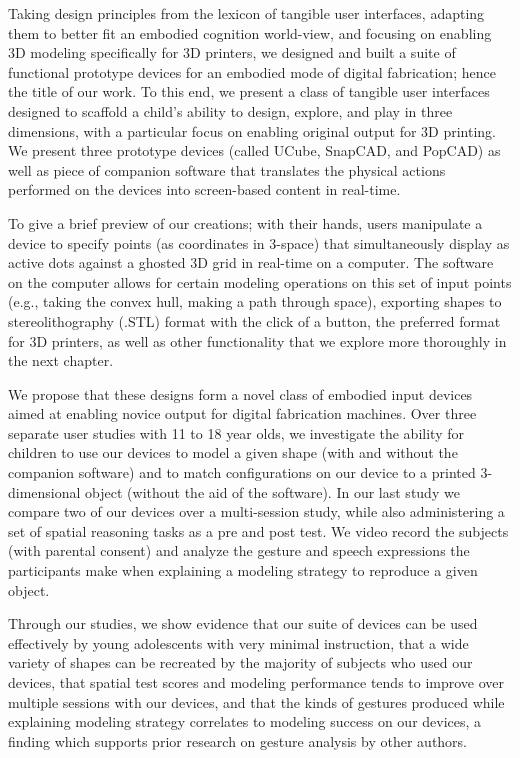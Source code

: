 Taking design principles from the lexicon of tangible user interfaces, adapting
them to better fit an embodied cognition world-view, and focusing on enabling 3D
modeling specifically for 3D printers, we designed and built a suite of
functional prototype devices for an embodied mode of digital fabrication; hence
the title of our work. To this end, we present a class of tangible user
interfaces designed to scaffold a child's ability to design, explore, and play
in three dimensions, with a particular focus on enabling original output for 3D
printing. We present three prototype devices (called UCube, SnapCAD,
and PopCAD) as well as piece of companion software that translates the physical
actions performed on the devices into screen-based content in real-time.

To give a brief preview of our creations; with their hands, users manipulate a
device to specify points (as coordinates in 3-space) that simultaneously display
as active dots against a ghosted 3D grid in real-time on a computer. The
software on the computer allows for certain modeling operations on this set of
input points (e.g., taking the convex hull, making a path through space),
exporting shapes to stereolithography (.STL) format with the click of a button,
the preferred format for 3D printers, as well as other functionality that we
explore more thoroughly in the next chapter.

We propose that these designs form a novel class of embodied input devices aimed
at enabling novice output for digital fabrication machines. Over three separate
user studies with 11 to 18 year olds, we investigate the ability for children to use
our devices to model a given shape (with and without the companion software) and
to match configurations on our device to a printed 3-dimensional object (without
the aid of the software). In our last study we compare two of our devices over a
multi-session study, while also administering a set of spatial reasoning tasks
as a pre and post test. We video record the subjects (with parental consent)
and analyze the gesture and speech expressions the participants make when
explaining a modeling strategy to reproduce a given object.

Through our studies, we show evidence that our suite of devices can be used
effectively by young adolescents with very minimal instruction, that a wide
variety of shapes can be recreated by the majority of subjects who used our
devices, that spatial test scores and modeling performance tends to improve over
multiple sessions with our devices, and that the kinds of gestures produced
while explaining modeling strategy correlates to modeling success on our
devices, a finding which supports prior research on gesture analysis by other
authors.

